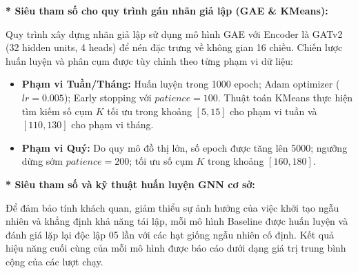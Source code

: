 \textbf{* Siêu tham số cho quy trình gán nhãn giả lập (GAE \& KMeans):}\vspace{0.2cm}

Quy trình xây dựng nhãn giả lập sử dụng mô hình GAE với Encoder là GATv2 (32 hidden units, 4 heads) để nén đặc trưng về không gian 16 chiều. Chiến lược huấn luyện và phân cụm được tùy chỉnh theo từng phạm vi dữ liệu:
\begin{itemize}[label={--}, itemsep=1pt]
    \item \textbf{Phạm vi Tuần/Tháng:} Huấn luyện trong 1000 epoch; Adam optimizer ($lr=0.005$); Early stopping với $patience=100$. Thuật toán KMeans thực hiện tìm kiếm số cụm $K$ tối ưu trong khoảng $[5, 15]$ cho phạm vi tuần và $[110, 130]$ cho phạm vi tháng.
    \item \textbf{Phạm vi Quý:} Do quy mô đồ thị lớn, số epoch được tăng lên 5000; ngưỡng dừng sớm $patience=200$; tối ưu số cụm $K$ trong khoảng $[160, 180]$.
\end{itemize}

\textbf{* Siêu tham số và kỹ thuật huấn luyện GNN cơ sở:}\vspace{0.2cm}

Để đảm bảo tính khách quan, giảm thiểu sự ảnh hưởng của việc khởi tạo ngẫu nhiên và khẳng định khả năng tái lập, mỗi mô hình Baseline được huấn luyện và đánh giá lặp lại độc lập 05 lần với các hạt giống ngẫu nhiên cố định. Kết quả hiệu năng cuối cùng của mỗi mô hình được báo cáo dưới dạng giá trị trung bình cộng của các lượt chạy.\vspace{0.2cm}

